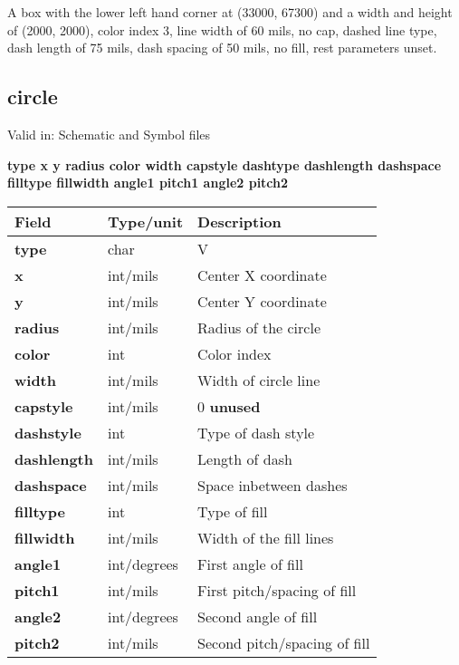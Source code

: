 \documentclass{article}
\begin{document}
A box with the lower left hand corner at (33000, 67300) and a width and height
of (2000, 2000), color index 3, line width of 60 mils, no cap, dashed line 
type, dash length of 75 mils, dash spacing of 50 mils, no fill, rest parameters 
unset.

\subsection{circle}

Valid in: Schematic and Symbol files

{\bf type x y radius color width capstyle dashtype dashlength dashspace filltype fillwidth angle1 pitch1 angle2 pitch2 }

\begin{table}[h]
\begin{tabular}{|l|l|l|} \hline
Field 		& Type/unit 	& Description \\ \hline 
\hline
{\bf type} 	& char		& V \\ \hline
{\bf x} 	& int/mils 	& Center X coordinate \\ \hline 
{\bf y} 	& int/mils	& Center Y coordinate \\ \hline
{\bf radius} 	& int/mils	& Radius of the circle \\ \hline
{\bf color} 	& int		& Color index \\ \hline
{\bf width} 	& int/mils	& Width of circle line \\ \hline
{\bf capstyle} 	& int/mils  	& 0 {\bf unused} \\ \hline
{\bf dashstyle} & int		& Type of dash style \\ \hline
{\bf dashlength}& int/mils	& Length of dash \\ \hline
{\bf dashspace} & int/mils	& Space inbetween dashes \\ \hline
{\bf filltype} 	& int		& Type of fill \\ \hline
{\bf fillwidth} & int/mils	& Width of the fill lines \\ \hline
{\bf angle1} 	& int/degrees	& First angle of fill \\ \hline
{\bf pitch1} 	& int/mils	& First pitch/spacing of fill \\ \hline
{\bf angle2} 	& int/degrees	& Second angle of fill \\ \hline
{\bf pitch2} 	& int/mils	& Second pitch/spacing of fill \\ \hline
\end{tabular}
\end{table}
\end{document}
